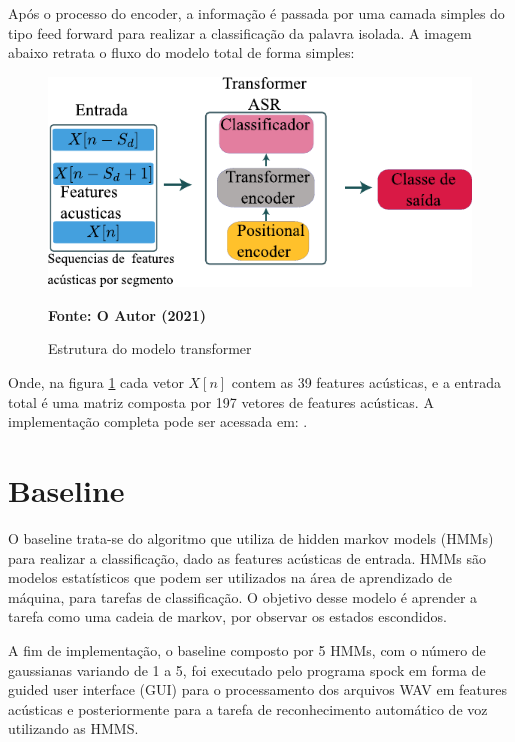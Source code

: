 \documentclass[
	12pt,				%
	openright,			%
	oneside,			%
	a4paper,			%
	chapter=TITLE,		%
	english,			%
	french,				%
	spanish,			%
	brazil				%
	]{abntex2}
\theoremstyle{definition}
\begin{document}
Após o processo do encoder, a informação é passada por uma camada simples do tipo feed forward para realizar a classificação da palavra isolada. A imagem abaixo retrata o fluxo do modelo total de forma simples:

\begin{figure}[!htb]
	\caption{Estrutura do modelo transformer}
	\label{fig:trans_pipe}
	\centering
	\includegraphics{transformer.pdf} \\
	\begin{small}\textbf{Fonte: O Autor (2021)}\end{small}
\end{figure}

Onde, na figura \ref{fig:trans_pipe} cada vetor $X[n]$ contem as 39 features acústicas, e a entrada total é uma matriz composta por 197 vetores de features acústicas. A implementação completa pode ser acessada em: .

\newpage
\section{Baseline}

O baseline trata-se do algoritmo que utiliza de hidden markov models (HMMs) para realizar a classificação, dado  as features acústicas de entrada. HMMs são modelos estatísticos que podem ser utilizados na área de aprendizado de máquina, para tarefas de classificação. O objetivo desse modelo é aprender a tarefa como uma cadeia de markov, por observar os estados escondidos.

A fim de implementação, o baseline composto por 5 HMMs, com o número de gaussianas variando de 1 a 5, foi executado pelo programa spock  em forma de guided user interface (GUI) para o processamento dos arquivos WAV em features acústicas e posteriormente para a tarefa de reconhecimento automático de voz utilizando as HMMS.
\end{document}
